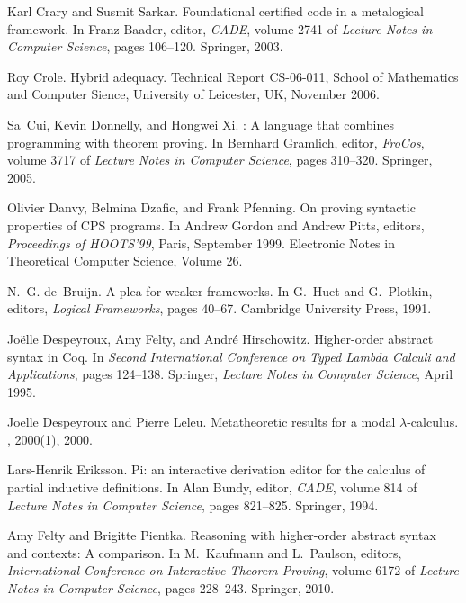 \documentclass[final]{svjour3}
\begin{document}
\begin{thebibliography}{100}
Karl Crary and Susmit Sarkar.
\newblock Foundational certified code in a metalogical framework.
\newblock In Franz Baader, editor, {\em CADE}, volume 2741 of {\em Lecture
  Notes in Computer Science}, pages 106--120. Springer, 2003.

Roy Crole.
\newblock Hybrid adequacy.
\newblock Technical Report CS-06-011, School of Mathematics and Computer
  Sience, University of Leicester, UK, November 2006.

Sa~Cui, Kevin Donnelly, and Hongwei Xi.
: {A} language that combines programming with theorem proving.
\newblock In Bernhard Gramlich, editor, {\em FroCos}, volume 3717 of {\em
  Lecture Notes in Computer Science}, pages 310--320. Springer, 2005.

Olivier Danvy, Belmina Dzafic, and Frank Pfenning.
\newblock On proving syntactic properties of {CPS} programs.
\newblock In Andrew Gordon and Andrew Pitts, editors, {\em Proceedings of
  HOOTS'99}, Paris, September 1999.
\newblock Electronic Notes in Theoretical Computer Science, Volume 26.

N.~G. de~Bruijn.
\newblock A plea for weaker frameworks.
\newblock In G.~Huet and G.~Plotkin, editors, {\em Logical Frameworks}, pages
  40--67. Cambridge University Press, 1991.

Jo{\"e}lle Despeyroux, Amy Felty, and Andr{\'e} Hirschowitz.
\newblock Higher-order abstract syntax in {Coq}.
\newblock In {\em Second International Conference on Typed Lambda Calculi and
  Applications}, pages 124--138. Springer, {\em Lecture Notes in Computer
  Science}, April 1995.

Joelle Despeyroux and Pierre Leleu.
\newblock Metatheoretic results for a modal $\lambda$-calculus.
, 2000(1), 2000.

Lars-Henrik Eriksson.
\newblock Pi: an interactive derivation editor for the calculus of partial
  inductive definitions.
\newblock In Alan Bundy, editor, {\em CADE}, volume 814 of {\em Lecture Notes
  in Computer Science}, pages 821--825. Springer, 1994.

Amy Felty and Brigitte Pientka.
\newblock Reasoning with higher-order abstract syntax and contexts: {A}
  comparison.
\newblock In M.~Kaufmann and L.~Paulson, editors, {\em International Conference
  on Interactive Theorem Proving}, volume 6172 of {\em Lecture Notes in
  Computer Science}, pages 228--243. Springer, 2010.


\end{thebibliography}
\end{document}
